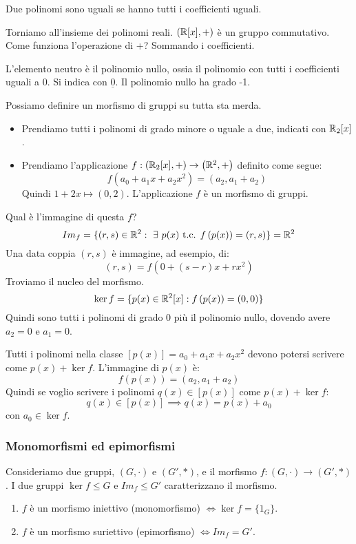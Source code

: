 \begin{defn}
Due polinomi sono uguali se hanno tutti i coefficienti uguali.
\end{defn}

Torniamo all'insieme dei polinomi reali. $\left( \mathbb{R}[x], + \right)$ \`e un gruppo commutativo. Come funziona l'operazione di +? Sommando i coefficienti. 

L'elemento neutro \`e il polinomio nullo, ossia il polinomio con tutti i coefficienti uguali a 0. Si indica con $\underline{0}$. Il polinomio nullo ha grado -1.

Possiamo definire un morfismo di gruppi su tutta sta merda.
\begin{itemize}
    \item Prendiamo tutti i polinomi di grado minore o uguale a due, indicati con $\mathbb{R}_2[x]$.
    \item Prendiamo l'applicazione $f : \left(\mathbb{R}_2[x], + \right) \to \left( \mathbb{R}^2, + \right)$ definito come segue:
    \[
    f \left( a_0 + a_1 x + a_2 x^2 \right) = \left( a_2, a_1 + a_2 \right)
    \]
    Quindi $1 + 2 x \mapsto (0, 2)$. L'applicazione $f$ \`e un morfismo di gruppi.
\end{itemize}
Qual \`e l'immagine di questa $f$? 
\[
Im_f = \{ (r, s) \in \reals^2 : \exists p(x) \text{ t.c. } f \left( p(x) \right) = (r,s)\} = \reals^2
\]
Una data coppia $(r,s)$ \`e immagine, ad esempio, di:
\[
(r, s) = f(0 + (s - r) x + r x^2)
\]
Troviamo il nucleo del morfismo.
\[
\ker f = \{ p(x) \in \mathbb{R}^2[x] : f \left( p(x) \right) = (0, 0)\}
\]
Quindi sono tutti i polinomi di grado 0 pi\`u il polinomio nullo, dovendo avere $a_2 = 0$ e $a_1 = 0$.

Tutti i polinomi nella classe $[p(x)] = a_0 + a_1 x + a_2 x^2$ devono potersi scrivere come $p(x) + \ker f$. L'immagine di $p(x)$ \`e:
\[
f \left( p(x) \right) = (a_2, a_1 + a_2)
\]
Quindi se voglio scrivere i polinomi $q(x) \in [p(x)]$ come $p(x) + \ker f$:
\[
q(x) \in [p(x)] \implies q(x) = p(x) + a_0
\]
con $a_0 \in \ker f$.

\subsubsection{Monomorfismi ed epimorfismi}

Consideriamo due gruppi, $(G, \cdot)$ e $(G', \ast)$, e il morfismo $f : (G, \cdot) \to (G', \ast)$. I due gruppi $\ker f \le G$ e $Im_f \le G'$ caratterizzano il morfismo.
\begin{enumerate}
    \item\label{itm:monomorfismo} $f$ \`e un morfismo iniettivo (monomorfismo) $\iff \ker f = \{ 1_G\}$.
    \item\label{itm:epimorfismo} $f$ \`e un morfismo suriettivo (epimorfismo) $\iff Im_f = G'$.
\end{enumerate}

